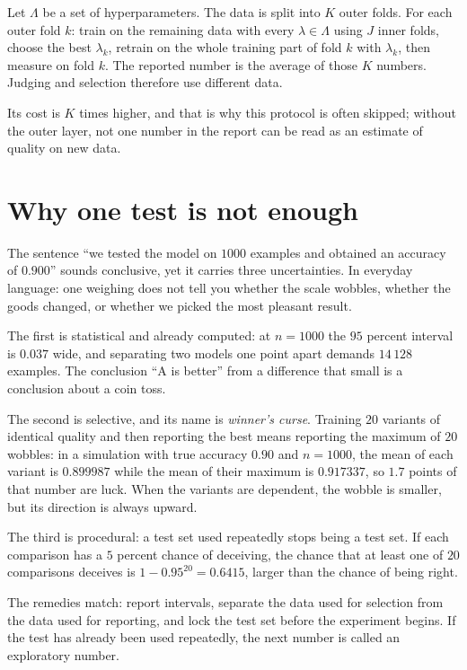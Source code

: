 \begin{definisi}
Let $\Lambda$ be a set of hyperparameters. The data is split into $K$ outer folds. For each outer
fold $k$: train on the remaining data with every $\lambda\in\Lambda$ using $J$ inner folds, choose
the best $\lambda_k$, retrain on the whole training part of fold $k$ with $\lambda_k$, then measure
on fold $k$. The reported number is the average of those $K$ numbers. Judging and selection
therefore use different data.
\end{definisi}

Its cost is $K$ times higher, and that is why this protocol is often skipped; without the outer
layer, not one number in the report can be read as an estimate of quality on new data.

\section{Why one test is not enough}

The sentence ``we tested the model on $1000$ examples and obtained an accuracy of $0.900$'' sounds
conclusive, yet it carries three uncertainties. In everyday language: one weighing does not tell
you whether the scale wobbles, whether the goods changed, or whether we picked the most pleasant
result.

The first is statistical and already computed: at $n=1000$ the $95$ percent interval is $0.037$
wide, and separating two models one point apart demands $14\,128$ examples. The conclusion ``A is
better'' from a difference that small is a conclusion about a coin toss.

The second is selective, and its name is \emph{winner's curse}. Training $20$ variants of identical
quality and then reporting the best means reporting the maximum of $20$ wobbles: in a simulation
with true accuracy $0.90$ and $n=1000$, the mean of each variant is $0.899987$ while the mean of
their maximum is $0.917337$, so $1.7$ points of that number are luck. When the variants are
dependent, the wobble is smaller, but its direction is always upward.

The third is procedural: a test set used repeatedly stops being a test set. If each comparison has
a $5$ percent chance of deceiving, the chance that at least one of $20$ comparisons deceives is
$1-0.95^{20}=0.6415$, larger than the chance of being right.

The remedies match: report intervals, separate the data used for selection from the data used for
reporting, and lock the test set before the experiment begins. If the test has already been used
repeatedly, the next number is called an exploratory number.

